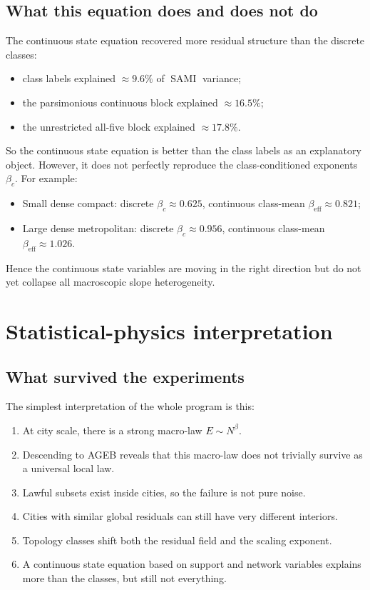 \documentclass[11pt]{article}
\newcommand{\SAMI}{\operatorname{SAMI}}
\begin{document}
\subsection{What this equation does and does not do}

The continuous state equation recovered more residual structure than the discrete classes:
\begin{itemize}
\item class labels explained \(\approx 9.6\%\) of \(\SAMI\) variance;
\item the parsimonious continuous block explained \(\approx 16.5\%\);
\item the unrestricted all-five block explained \(\approx 17.8\%\).
\end{itemize}

So the continuous state equation is better than the class labels as an explanatory object. However, it does not perfectly reproduce the class-conditioned exponents \(\beta_c\). For example:
\begin{itemize}
\item Small dense compact: discrete \(\beta_c \approx 0.625\), continuous class-mean \(\beta_{\mathrm{eff}} \approx 0.821\);
\item Large dense metropolitan: discrete \(\beta_c \approx 0.956\), continuous class-mean \(\beta_{\mathrm{eff}} \approx 1.026\).
\end{itemize}

Hence the continuous state variables are moving in the right direction but do not yet collapse all macroscopic slope heterogeneity.

\section{Statistical-physics interpretation}

\subsection{What survived the experiments}

The simplest interpretation of the whole program is this:
\begin{enumerate}[label=\arabic*.,leftmargin=2.0em]
\item At city scale, there is a strong macro-law \(E \sim N^\beta\).
\item Descending to AGEB reveals that this macro-law does not trivially survive as a universal local law.
\item Lawful subsets exist inside cities, so the failure is not pure noise.
\item Cities with similar global residuals can still have very different interiors.
\item Topology classes shift both the residual field and the scaling exponent.
\item A continuous state equation based on support and network variables explains more than the classes, but still not everything.
\end{enumerate}
\end{document}
